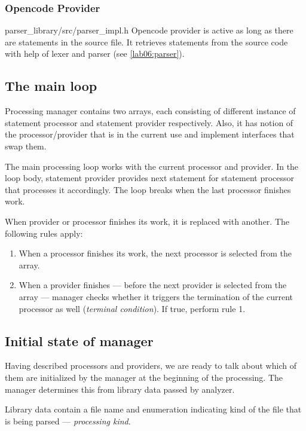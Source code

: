 \subsubsection{Opencode Provider}
{parser\_library/src/parser\_impl.h}
Opencode provider is active as long as there are statements in the source file. It retrieves statements from the source code with help of lexer and parser (see \cref{lab06:parser}).

\subsection{The main loop}
\label{lab06:mngr_loop}

Processing manager contains two arrays, each consisting of different instance of statement processor and statement provider respectively.  Also, it has notion of the processor/provider that is in the current use and implement interfaces that swap them.

The main processing loop works with the current processor and provider. In the loop body, statement provider provides next statement for statement processor that processes it accordingly. The loop breaks when the last processor finishes work.

When provider or processor finishes its work, it is replaced with another. The following rules apply:

\begin{enumerate}
	\item When a processor finishes its work, the next processor is selected from the array.
	\item When a provider finishes --- before the next provider is selected from the array --- manager checks whether it triggers the termination of the current processor as well (\emph{terminal condition}). If true, perform rule 1.
\end{enumerate}

\subsection{Initial state of manager}
\label{lab06:lib_data}
Having described processors and providers, we are ready to talk about which of them are initialized by the manager at the beginning of the processing. The manager determines this from library data passed by analyzer.

Library data contain a file name and enumeration indicating kind of the file that is being parsed --- \emph{processing kind}.

